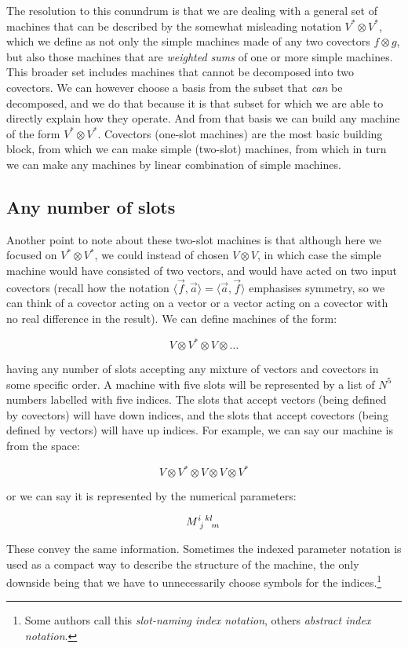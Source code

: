 The resolution to this conundrum is that we are dealing with a general set of machines that can be described by the somewhat misleading notation $V^* \otimes V^*$, which we define as not only the simple machines made of any two covectors $f \otimes g$, but also those machines that are \textit{weighted sums} of one or more simple machines. This broader set includes machines that cannot be decomposed into two covectors. We can however choose a basis from the subset that \textit{can} be decomposed, and we do that because it is that subset for which we are able to directly explain how they operate. And from that basis we can build any machine of the form $V^* \otimes V^*$. Covectors (one-slot machines) are the most basic building block, from which we can make simple (two-slot) machines, from which in turn we can make any machines by linear combination of simple machines.

\subsection{Any number of slots}

Another point to note about these two-slot machines is that although here we focused on $V^* \otimes V^*$, we could instead of chosen $V \otimes V$, in which case the simple machine would have consisted of two vectors, and would have acted on two input covectors (recall how the notation $\langle \vec{f}, \vec{a} \rangle = \langle \vec{a}, \vec{f} \rangle$ emphasises symmetry, so we can think of a covector acting on a vector or a vector acting on a covector with no real difference in the result). We can define machines of the form: 

$$
V \otimes V^* \otimes V \otimes \ldots
$$ 

having any number of slots accepting any mixture of vectors and covectors in some specific order. A machine with five slots will be represented by a list of $N^5$ numbers labelled with five indices. The slots that accept vectors (being defined by covectors) will have down indices, and the slots that accept covectors (being defined by vectors) will have up indices. For example, we can say our machine is from the space:

$$
V \otimes V^* \otimes V \otimes V \otimes V^*
$$ 

or we can say it is represented by the numerical parameters:

$$
M\indices{^i_j^k^l_m}
$$

These convey the same information. Sometimes the indexed parameter notation is used as a compact way to describe the structure of the machine, the only downside being that we have to unnecessarily choose symbols for the indices.\footnote{Some authors call this \textit{slot-naming index notation}, others \textit{abstract index notation}.}

